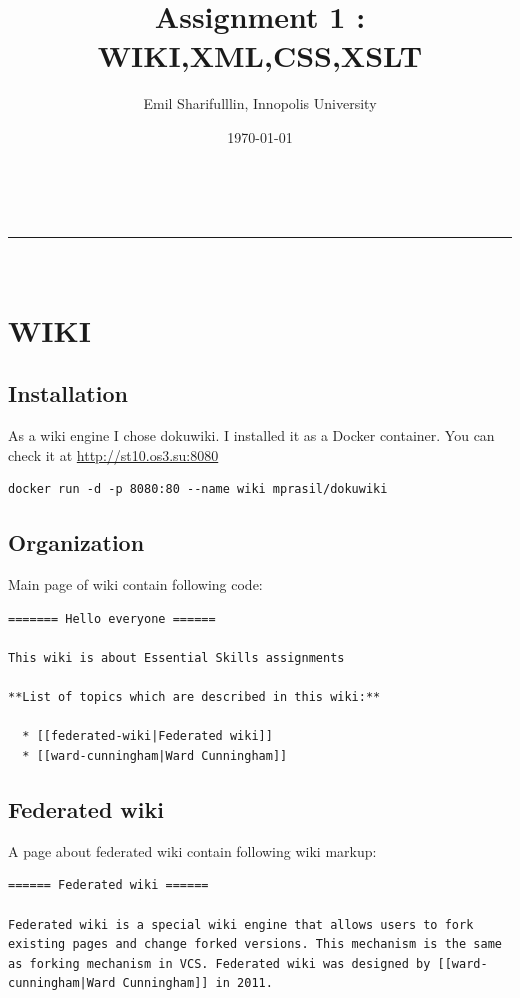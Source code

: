 \documentclass[a4paper,11pt]{article}
\makeatletter
\newcommand*{\TitleFont}{%
      \usefont{\encodingdefault}{\rmdefault}{b}{n}%
      \fontsize{16}{20}%
      \selectfont}
\newcommand{\linia}{\rule{\linewidth}{0.5pt}}
\theoremstyle{mytheor}
\renewcommand{\maketitle}{
\begin{center}
\vspace{2ex}
{\huge \textsc{\@title}}
\vspace{1ex}
\\
\linia\\
\@author \hfill \@date
\vspace{4ex}
\end{center}
}
\makeatother
\begin{document}
\title{\TitleFont Assignment 1 : WIKI,XML,CSS,XSLT }

\author{Emil Sharifulllin, Innopolis University}

\date{\today}

\maketitle

\section{WIKI}

\subsection{Installation}
As a wiki engine I chose dokuwiki. I installed it as a Docker container. You can check it at \href{http://st10.os3.su:8080}{http://st10.os3.su:8080}

\begin{lstlisting}
docker run -d -p 8080:80 --name wiki mprasil/dokuwiki
\end{lstlisting}

\subsection{Organization}
Main page of wiki contain following code:
\begin{lstlisting}
======= Hello everyone ======

This wiki is about Essential Skills assignments

**List of topics which are described in this wiki:**

  * [[federated-wiki|Federated wiki]]
  * [[ward-cunningham|Ward Cunningham]]
\end{lstlisting}

\subsection{Federated wiki}
A page about federated wiki contain following wiki markup:

\begin{lstlisting}
====== Federated wiki ======

Federated wiki is a special wiki engine that allows users to fork existing pages and change forked versions. This mechanism is the same as forking mechanism in VCS. Federated wiki was designed by [[ward-cunningham|Ward Cunningham]] in 2011. 
\end{lstlisting}
\end{document}
